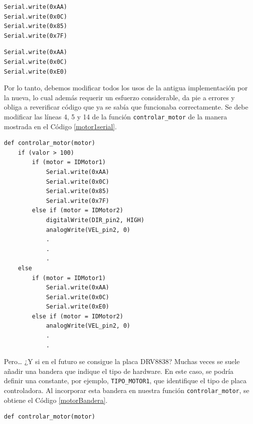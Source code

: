 \begin{enumerate}
\begin{lstlisting}[caption=Configuración de la placa de control del motor DC utiliza comunicación serie., label={listingDistinto}]
    \end{lstlisting}
\begin{lstlisting}[caption=Establecer máxima velocidad giro horario para el caso de comunicación en serie., label={maxSerial}]
Serial.write(0xAA)
Serial.write(0x0C)
Serial.write(0x85)
Serial.write(0x7F)
\end{lstlisting}
\begin{lstlisting}[caption=Establecer detención para el caso de comunicación en serie., label={detSerial}]
Serial.write(0xAA)
Serial.write(0x0C)
Serial.write(0xE0)
\end{lstlisting}
Por lo tanto, debemos modificar todos los usos de la antigua implementación por la nueva, lo cual además requerir un esfuerzo considerable, da pie a errores y obliga a reverificar código que ya se sabía que funcionaba correctamente. Se debe modificar las líneas 4, 5 y 14 de la función \verb|controlar_motor| de la manera mostrada en el Código \ref{motor1serial}.

\begin{lstlisting}[caption=Modificación de la función controlar\_motor para utilizar placa de control serial para controlar el motor 1.,label={motor1serial}]
def controlar_motor(motor)
	if (valor > 100)
        if (motor = IDMotor1)
            Serial.write(0xAA)
            Serial.write(0x0C)
            Serial.write(0x85)
            Serial.write(0x7F)
        else if (motor = IDMotor2)
            digitalWrite(DIR_pin2, HIGH)
            analogWrite(VEL_pin2, 0)
            .
            .
            .
    else
        if (motor = IDMotor1)
            Serial.write(0xAA)
            Serial.write(0x0C)
            Serial.write(0xE0)
        else if (motor = IDMotor2)
            analogWrite(VEL_pin2, 0)
            .
            .
\end{lstlisting}

Pero… ¿Y si en el futuro se consigue la placa \gls{DRV8838}? Muchas veces se suele añadir una bandera que indique el tipo de hardware. En este caso, se podría definir una constante, por ejemplo, \verb|TIPO_MOTOR1|, que identifique el tipo de placa controladora. Al incorporar esta bandera en nuestra función \verb|controlar_motor|, se obtiene el Código \ref{motorBandera}.

\begin{lstlisting}[caption=Modificación de la función controlar\_motor para utilizar bandera indicadora de tipo de placa controladora.,label={motorBandera}]
def controlar_motor(motor)


\end{lstlisting}
\end{enumerate}
